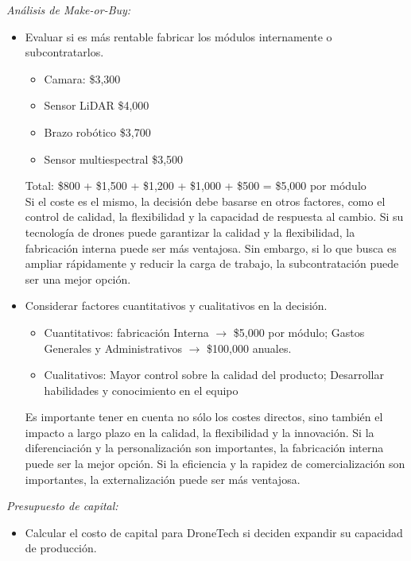 \documentclass[letterpaper,12pt]{article}
\begin{document}
\begin{sloppypar}
\begin{itemize}
\end{itemize}
\newpage
\textit{Análisis de Make-or-Buy:}
\begin{itemize}
    \item Evaluar si es más rentable fabricar los módulos internamente o
    subcontratarlos.
    \begin{itemize}
        \item Camara: \$3,300
        \item Sensor LiDAR \$4,000
        \item Brazo robótico \$3,700
        \item Sensor multiespectral \$3,500
    \end{itemize}
    Total: \$800 + \$1,500 + \$1,200 + \$1,000 + \$500 = \$5,000 por módulo
    \vspace{0.3cm}\\ 
    Si el coste es el mismo, la decisión debe basarse en otros factores, como el control de calidad, la flexibilidad y la capacidad de respuesta al cambio. Si su tecnología de drones puede garantizar la calidad y la flexibilidad, la fabricación interna puede ser más ventajosa. Sin embargo, si lo que busca es ampliar rápidamente y reducir la carga de trabajo, la subcontratación puede ser una mejor opción.
    \item Considerar factores cuantitativos y cualitativos en la decisión.
    \begin{itemize}
        \item Cuantitativos: fabricación Interna $\rightarrow$ \$5,000 por módulo; Gastos Generales y Administrativos $\rightarrow$ \$100,000 anuales.
        \item Cualitativos: Mayor control sobre la calidad del producto; Desarrollar habilidades y conocimiento en el equipo
    \end{itemize}
    Es importante tener en cuenta no sólo los costes directos, sino también el impacto a largo plazo en la calidad, la flexibilidad y la innovación. Si la diferenciación y la personalización son importantes, la fabricación interna puede ser la mejor opción. Si la eficiencia y la rapidez de comercialización son importantes, la externalización puede ser más ventajosa.
\end{itemize}
\textit{Presupuesto de capital:}
\begin{itemize}
    \item Calcular el costo de capital para DroneTech si deciden expandir su
    capacidad de producción.
    \begin{itemize}

\end{itemize}
\end{itemize}
\end{sloppypar}
\end{document}

